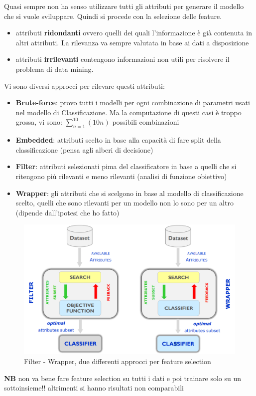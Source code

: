 Quasi sempre non ha senso utilizzare tutti gli attributi per generare il modello che si vuole sviluppare. Quindi si procede con la selezione delle feature.
\begin{itemize}
	\item attributi \textbf{ridondanti} ovvero quelli dei quali l'informazione \`e gi\`a contenuta in altri attributi. La rilevanza va sempre valutata in base ai dati a disposizione
	\item attributi \textbf{irrilevanti} contengono informazioni non utili per risolvere il problema di data mining.
\end{itemize}
Vi sono diversi approcci per rilevare questi attributi:
\begin{itemize}
	\item \textbf{Brute-force}: provo tutti i modelli per ogni combinazione di parametri usati nel modello di Classificazione. Ma la computazione di questi casi \`e troppo grossa, vi sono: $\sum_{n=1}^{10}\left(10 n\right)$ possibili combinazioni
	\item \textbf{Embedded}: attributi scelto in base alla capacit\`a di fare split della classificazione (pensa agli alberi di decisione)
	\item \textbf{Filter}: attributi selezionati pima del classificatore in base a quelli che si ritengono pi\`u rilevanti e meno rilevanti (analisi di funzione obiettivo)
	\item \textbf{Wrapper}: gli attributi che si scelgono in base al modello di classificazione scelto, quelli che sono rilevanti per un modello non lo sono per un altro (dipende dall'ipotesi che ho fatto)
\end{itemize}
\begin{figure}[h!]
	\centering
	\includegraphics[height=0.45 \linewidth]{classification/pict/filter_wrapper.png}
	\caption{Filter - Wrapper, due differenti approcci per feature selection}
\end{figure}
\textbf{NB} non va bene fare feature selection su tutti i dati e poi trainare solo su un sottoinsieme!! altrimenti si hanno risultati non comparabili
